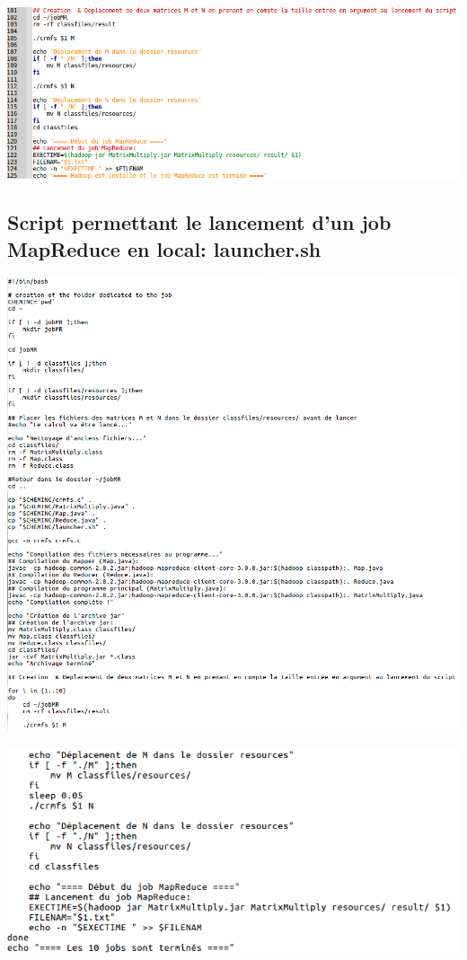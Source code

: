 \documentclass[a4paper, 11pt]{article}
\begin{document}
    \label{hfs4}
  	\begin{center}
        \includegraphics[scale=0.7, angle=90]{./img/hfs4.png}
    \end{center}
    \vspace{2\baselineskip}
    \clearpage    
    
    \subsection{Script permettant le lancement d'un job MapReduce en local: launcher.sh}    
    \label{launcher1}
    \begin{flushleft}
    \includegraphics[scale=0.45, angle=0]{./img/codeLauncherP1.png}
    \end{flushleft}
    
    \label{launcher2}
        \includegraphics[scale=0.65, angle=0]{./img/codeLauncherP2.png}
        \vspace{1\baselineskip}
        
\end{document}
